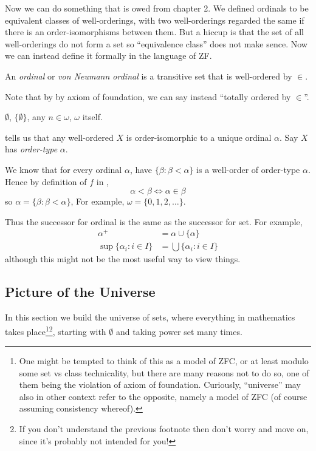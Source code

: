 \documentclass[a4paper]{article}
\begin{document}
Now we can do something that is owed from chapter 2. We defined ordinals to be equivalent classes of well-orderings, with two well-orderings regarded the same if there is an order-isomorphisms between them. But a hiccup is that the set of all well-orderings do not form a set so ``equivalence class'' does not make sence. Now we can instead define it formally in the language of ZF.

\begin{definition}
  An \emph{ordinal} or \emph{von Neumann ordinal} is a transitive set that is well-ordered by \(\in\).
\end{definition}

Note that by by axiom of foundation, we can say instead ``totally ordered by \(\in\)''.

\begin{eg}
  \(\emptyset\), \(\{\emptyset\}\), any \(n \in \omega\), \(\omega\) itself.
\end{eg}

 tells us that any well-ordered \(X\) is order-isomorphic to a unique ordinal \(\alpha\). Say \(X\) has \emph{order-type} \(\alpha\).

\begin{remark}
  We know that for every ordinal \(\alpha\), have \(\{\beta: \beta < \alpha\}\) is a well-order of order-type \(\alpha\). Hence by definition of \(f\) in ,
  \[
    \alpha < \beta \iff \alpha \in \beta
  \]
  so \(\alpha = \{\beta: \beta < \alpha\}\),
  For example, \(\omega = \{0, 1, 2, \dots\}\).

  Thus the successor for ordinal is the same as the successor for set. For example,
  \begin{align*}
    \alpha^+ &= \alpha \cup \{\alpha\} \\
    \sup \{\alpha_i: i \in I\} &= \bigcup \{\alpha_i: i \in I\}
  \end{align*}
  although this might not be the most useful way to view things.
\end{remark}

\subsection{Picture of the Universe}

In this section we build the universe of sets, where everything in mathematics takes place\footnote{One might be tempted to think of this as a model of ZFC, or at least modulo some set vs class technicality, but there are many reasons not to do so, one of them being the violation of axiom of foundation. Curiously, ``universe'' may also in other context refer to the opposite, namely a model of ZFC (of course assuming consistency whereof).}\footnote{If you don't understand the previous footnote then don't worry and move on, since it's probably not intended for you!}, starting with \(\emptyset\) and taking power set many times.
\end{document}

